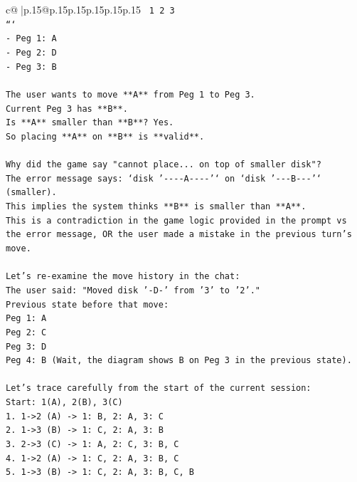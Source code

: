 \documentclass{article}
\begin{document}
{\begin{supertabular}{c@{$\;$}|p{.15\linewidth}@{}p{.15\linewidth}p{.15\linewidth}p{.15\linewidth}p{.15\linewidth}p{.15\linewidth}}
{{{\texttt{    1         2         3    } \\
\texttt{```} \\
\texttt{{-} Peg 1: A} \\
\texttt{{-} Peg 2: D} \\
\texttt{{-} Peg 3: B} \\
\\ 
\texttt{The user wants to move **A** from Peg 1 to Peg 3.} \\
\texttt{Current Peg 3 has **B**.} \\
\texttt{Is **A** smaller than **B**? Yes.} \\
\texttt{So placing **A** on **B** is **valid**.} \\
\\ 
\texttt{Why did the game say "cannot place... on top of smaller disk"?} \\
\texttt{The error message says: `disk '{-}{-}{-}{-}A{-}{-}{-}{-}'` on `disk '{-}{-}{-}B{-}{-}{-}'` (smaller).} \\
\texttt{This implies the system thinks **B** is smaller than **A**.} \\
\texttt{This is a contradiction in the game logic provided in the prompt vs the error message, OR the user made a mistake in the previous turn's move.} \\
\\ 
\texttt{Let's re{-}examine the move history in the chat:} \\
\texttt{The user said: "Moved disk '{-}D{-}' from '3' to '2'."} \\
\texttt{Previous state before that move:} \\
\texttt{Peg 1: A} \\
\texttt{Peg 2: C} \\
\texttt{Peg 3: D} \\
\texttt{Peg 4: B (Wait, the diagram shows B on Peg 3 in the previous state).} \\
\\ 
\texttt{Let's trace carefully from the start of the current session:} \\
\texttt{Start: 1(A), 2(B), 3(C)} \\
\texttt{1. 1{-}>2 (A) {-}> 1: B, 2: A, 3: C} \\
\texttt{2. 1{-}>3 (B) {-}> 1: C, 2: A, 3: B} \\
\texttt{3. 2{-}>3 (C) {-}> 1: A, 2: C, 3: B, C} \\
\texttt{4. 1{-}>2 (A) {-}> 1: C, 2: A, 3: B, C} \\
\texttt{5. 1{-}>3 (B) {-}> 1: C, 2: A, 3: B, C, B} \\
}}}
\end{supertabular}}
\end{document}
